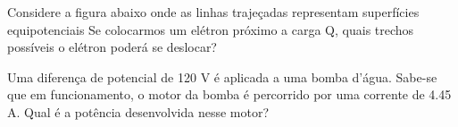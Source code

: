 \documentclass[12pt, addpoints]{exam}
\begin{document}
\begin{questions}
\begin{multicols*}{2}
\begin{oneparchoices}
\end{oneparchoices}
\question[20] Considere a figura abaixo onde as linhas trajeçadas representam superfícies equipotenciais Se colocarmos um elétron próximo a carga Q, quais trechos possíveis o elétron poderá se deslocar?
        
        \begin{center}
            \begin{minipage}[c]{0.5\linewidth}
            \end{minipage}
        \end{center}
        
        

\begin{oneparchoices}
\end{oneparchoices}
\question[20] Uma diferença de potencial de 120 V é aplicada a uma bomba d’água. Sabe-se que em funcionamento, o motor da bomba é percorrido por uma corrente de    4.45 A. Qual é a potência desenvolvida nesse motor?


\end{multicols*}
\end{questions}
\end{document}
